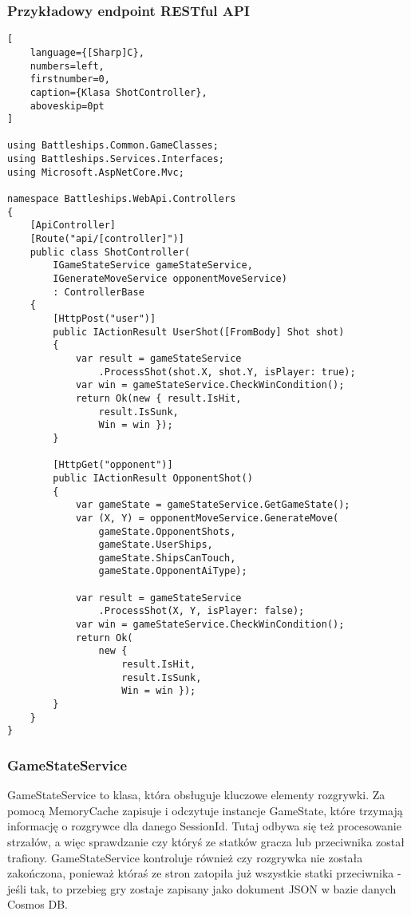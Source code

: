 \tocless\subsubsection{Przykładowy endpoint RESTful API}

\begin{addmargin}[0mm]{0mm}
\begin{lstlisting}[
    language={[Sharp]C},
    numbers=left,
    firstnumber=0,
    caption={Klasa ShotController},
    aboveskip=0pt
]

using Battleships.Common.GameClasses;
using Battleships.Services.Interfaces;
using Microsoft.AspNetCore.Mvc;

namespace Battleships.WebApi.Controllers
{
    [ApiController]
    [Route("api/[controller]")]
    public class ShotController(
        IGameStateService gameStateService,
        IGenerateMoveService opponentMoveService)
        : ControllerBase
    {
        [HttpPost("user")]
        public IActionResult UserShot([FromBody] Shot shot)
        {
            var result = gameStateService
                .ProcessShot(shot.X, shot.Y, isPlayer: true);
            var win = gameStateService.CheckWinCondition();
            return Ok(new { result.IsHit,
                result.IsSunk,
                Win = win });
        }

        [HttpGet("opponent")]
        public IActionResult OpponentShot()
        {
            var gameState = gameStateService.GetGameState();
            var (X, Y) = opponentMoveService.GenerateMove(
                gameState.OpponentShots,
                gameState.UserShips,
                gameState.ShipsCanTouch,
                gameState.OpponentAiType);

            var result = gameStateService
                .ProcessShot(X, Y, isPlayer: false);
            var win = gameStateService.CheckWinCondition();
            return Ok(
                new { 
                    result.IsHit,
                    result.IsSunk,
                    Win = win });
        }
    }
}

\end{lstlisting}
\end{addmargin}


\tocless\subsubsection{GameStateService}

GameStateService to klasa, która obsługuje kluczowe elementy rozgrywki. Za pomocą MemoryCache zapisuje i odczytuje instancje GameState, które trzymają informację o rozgrywce dla danego SessionId. Tutaj odbywa się też procesowanie strzałów, a więc sprawdzanie czy któryś ze statków gracza lub przeciwnika został trafiony. GameStateService kontroluje również czy rozgrywka nie została zakończona, ponieważ któraś ze stron zatopiła już wszystkie statki przeciwnika - jeśli tak, to przebieg gry zostaje zapisany jako dokument JSON w bazie danych Cosmos DB.

